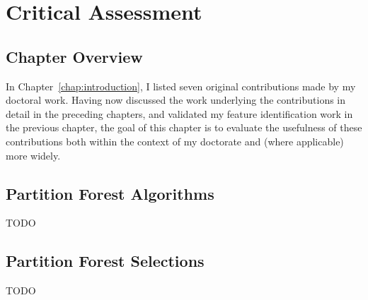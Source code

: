 \chapter{Critical Assessment}
\label{chap:assessment}

\section{Chapter Overview}

In Chapter~\ref{chap:introduction}, I listed seven original contributions made by my doctoral work. Having now discussed the work underlying the contributions in detail in the preceding chapters, and validated my feature identification work in the previous chapter, the goal of this chapter is to evaluate the usefulness of these contributions both within the context of my doctorate and (where applicable) more widely.

\section{Partition Forest Algorithms}

TODO

\iffalse
+ Useful both for imaging and hierarchical pathfinding
+ Algorithms carefully pinned down, well-justified, reasonable complexities
+ Parent switching algorithm improves on previous state-of-the-art (Nacken) because it makes extra reasonable parent switches possible
+ Unzipping, zipping, non-sibling node merging have no obvious comparisons in the literature
\fi

\section{Partition Forest Selections}

TODO

\iffalse
+ Usefulness well-justified
+ Algorithms carefully pinned down, reasonable complexities
+ No comparison in the literature
+ Can be reused for feature marking
\fi

